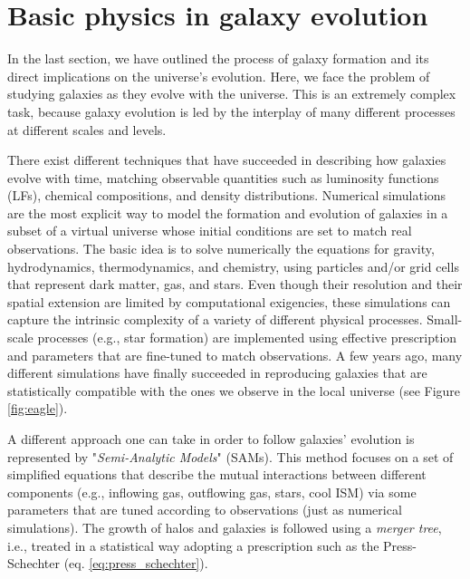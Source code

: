  
 
 

\section{Basic physics in galaxy evolution} \label{sec:physics_galaxies}
  


 In the last section, we have outlined the process of galaxy formation and its direct implications on the universe's evolution. Here, we face the problem of studying galaxies as they evolve with the universe. This is an extremely complex task, because galaxy evolution is led by the interplay of many different processes at different scales and levels. 
 
 There exist different techniques that have succeeded in describing how galaxies evolve with time, matching observable quantities such as luminosity functions (LFs), chemical compositions, and density distributions. Numerical simulations are the most explicit way to model the formation and evolution of galaxies in a subset of a virtual universe whose initial conditions are set to match real observations. The basic idea is to solve numerically the equations for gravity, hydrodynamics, thermodynamics, and chemistry, using particles and/or grid cells that represent dark matter, gas, and stars. Even though their resolution and their spatial extension are limited by computational exigencies, these simulations can capture the intrinsic complexity of a variety of different physical processes. Small-scale processes (e.g., star formation) are implemented using effective prescription and parameters that are fine-tuned to match observations. A few years ago, many different simulations have finally succeeded in reproducing galaxies that are statistically compatible with the ones we observe in the local universe (see Figure \ref{fig:eagle}). 
 
 A different approach one can take in order to follow galaxies' evolution is represented by "\textit{Semi-Analytic Models}" (SAMs).  This method focuses on a set of simplified equations that describe the mutual interactions between different components (e.g., inflowing gas, outflowing gas, stars, cool ISM) via some parameters that are tuned according to observations (just as numerical simulations). The growth of halos and galaxies is followed using a \textit{merger tree}, i.e., treated in a statistical way adopting a prescription such as the Press-Schechter (eq. \ref{eq:press_schechter}).

